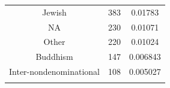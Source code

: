 \documentclass[]{tufte-book}
\begin{document}
\begin{longtable}[]{@{}ccc@{}}
\begin{minipage}[t]{0.33\columnwidth}\centering\strut
Jewish\strut
\end{minipage} & \begin{minipage}[t]{0.15\columnwidth}\centering\strut
383\strut
\end{minipage} & \begin{minipage}[t]{0.25\columnwidth}\centering\strut
0.01783\strut
\end{minipage}\tabularnewline
\begin{minipage}[t]{0.33\columnwidth}\centering\strut
NA\strut
\end{minipage} & \begin{minipage}[t]{0.15\columnwidth}\centering\strut
230\strut
\end{minipage} & \begin{minipage}[t]{0.25\columnwidth}\centering\strut
0.01071\strut
\end{minipage}\tabularnewline
\begin{minipage}[t]{0.33\columnwidth}\centering\strut
Other\strut
\end{minipage} & \begin{minipage}[t]{0.15\columnwidth}\centering\strut
220\strut
\end{minipage} & \begin{minipage}[t]{0.25\columnwidth}\centering\strut
0.01024\strut
\end{minipage}\tabularnewline
\begin{minipage}[t]{0.33\columnwidth}\centering\strut
Buddhism\strut
\end{minipage} & \begin{minipage}[t]{0.15\columnwidth}\centering\strut
147\strut
\end{minipage} & \begin{minipage}[t]{0.25\columnwidth}\centering\strut
0.006843\strut
\end{minipage}\tabularnewline
\begin{minipage}[t]{0.33\columnwidth}\centering\strut
Inter-nondenominational\strut
\end{minipage} & \begin{minipage}[t]{0.15\columnwidth}\centering\strut
108\strut
\end{minipage} & \begin{minipage}[t]{0.25\columnwidth}\centering\strut
0.005027\strut
\end{minipage}\tabularnewline
\begin{minipage}[t]{0.33\columnwidth}\centering\strut

\end{minipage}
\end{longtable}
\end{document}
